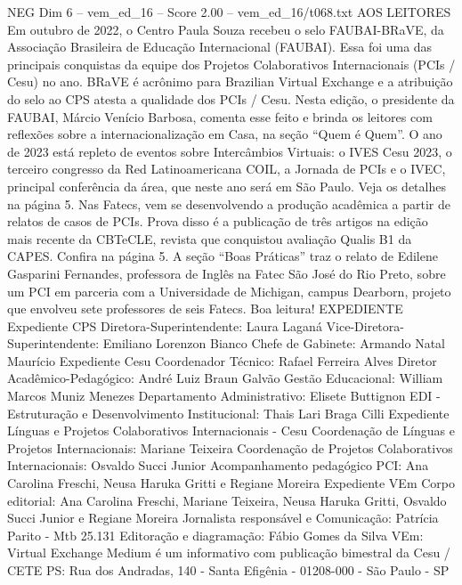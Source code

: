 \begin{textsample}{NEG Dim 6 – vem\_ed\_16 – Score 2.00 – vem\_ed\_16/t068.txt}  \label{ex:f6_neg_017}
AOS LEITORES Em outubro de 2022, o Centro Paula Souza recebeu o selo FAUBAI-BRaVE, da Associação Brasileira de Educação Internacional (FAUBAI).
Essa foi uma das principais conquistas da equipe dos Projetos Colaborativos Internacionais (PCIs / Cesu) no ano.
BRaVE é acrônimo para Brazilian Virtual Exchange e a atribuição do selo ao CPS atesta a qualidade dos PCIs / Cesu.
Nesta edição, o presidente da FAUBAI, Márcio Venício Barbosa, comenta esse feito e brinda os leitores com reflexões sobre a internacionalização em Casa, na seção “Quem é Quem”.
O ano de 2023 está repleto de eventos sobre Intercâmbios Virtuais: o IVES Cesu 2023, o terceiro congresso da Red Latinoamericana COIL, a Jornada de PCIs e o IVEC, principal conferência da área, que neste ano será em São Paulo.
Veja os detalhes na página 5.
Nas Fatecs, vem se desenvolvendo a produção acadêmica a partir de relatos de casos de PCIs.
Prova disso é a publicação de três artigos na edição mais recente da CBTeCLE, revista que conquistou avaliação Qualis B1 da CAPES.
Confira na página 5.
A seção “Boas Práticas” traz o relato de Edilene Gasparini Fernandes, professora de Inglês na Fatec São José do Rio Preto, sobre um PCI em parceria com a Universidade de Michigan, campus Dearborn, projeto que envolveu sete professores de seis Fatecs.
Boa leitura!
EXPEDIENTE Expediente CPS Diretora-Superintendente: Laura Laganá Vice-Diretora-Superintendente: Emiliano Lorenzon Bianco Chefe de Gabinete: Armando Natal Maurício Expediente Cesu Coordenador Técnico: Rafael Ferreira Alves Diretor Acadêmico-Pedagógico: André Luiz Braun Galvão Gestão Educacional: William Marcos Muniz Menezes Departamento Administrativo: Elisete Buttignon EDI - Estruturação e Desenvolvimento Institucional: Thais Lari Braga Cilli Expediente Línguas e Projetos Colaborativos Internacionais - Cesu Coordenação de Línguas e Projetos Internacionais: Mariane Teixeira Coordenação de Projetos Colaborativos Internacionais: Osvaldo Succi Junior Acompanhamento pedagógico PCI: Ana Carolina Freschi, Neusa Haruka Gritti e Regiane Moreira Expediente VEm Corpo editorial: Ana Carolina Freschi, Mariane Teixeira, Neusa Haruka Gritti, Osvaldo Succi Junior e Regiane Moreira Jornalista responsável e Comunicação: Patrícia Parito - Mtb 25.131 Editoração e diagramação: Fábio Gomes da Silva VEm: Virtual Exchange Medium é um informativo com publicação bimestral da Cesu / CETE PS: Rua dos Andradas, 140 - Santa Efigênia - 01208-000 - São Paulo - SP

\end{textsample}

